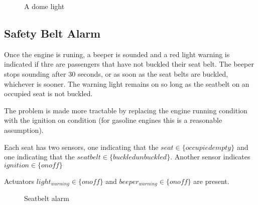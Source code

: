 \documentclass{article}
\begin{document}
\begin{figure}[h!]


\caption{A dome light}
\label{fig:dome_light}
\end{figure}


\subsection{Safety Belt Alarm}
Once the engine is runing, 
a beeper is sounded and
a red light warning is indicated if thre are 
passengers that have not buckled their seat belt.
The beeper stops sounding after 30 seconds, or
as soon as the seat belts are buckled,
whichever is sooner.
The warning light remains on so long as the
seatbelt on an occupied seat is not buckled.

The problem is made more tractable by 
replacing the engine running condition with
the ignition on condition (for gasoline engines
this is a reasonable assumption).


Each seat has two sensors, one indicating that
the $seat \in \{occupied empty\}$
and one indicating that the 
$seatbelt \in \{buckled unbuckled\}$.
Another sensor indicates 
$ignition \in \{on off\}$

Actuators $light_{warning} \in \{on off\}$
and $beeper_{warning} \in \{on off\}$ are present.



\begin{figure}[h!]

\caption{Seatbelt alarm}
\label{fig:seatbelt_alarm}
\end{figure}
\end{document}
